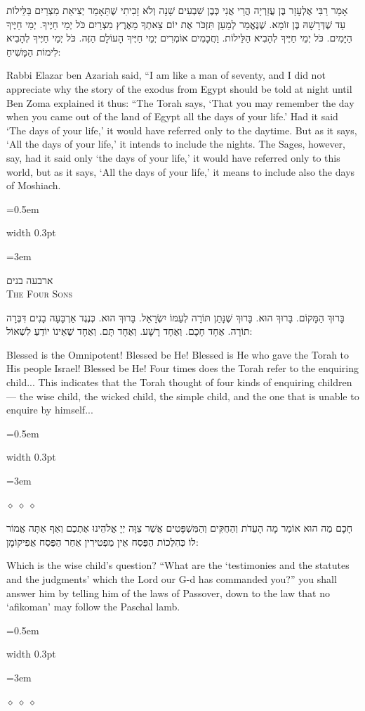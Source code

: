 \documentclass[11pt, openany]{book}
\newcommand{\sederdivider}{%
  \par\vspace{6pt}
  \begin{center}
    \textcolor{sedergold}{\pgfornament[width=1.5cm]{11}}
  \end{center}
  \par\vspace{6pt}
}
\newlength{\bidiHebWidth}
\newlength{\bidiEngWidth}
\newenvironment{bilingual}{%
  \par\vspace{4pt}%
}{%
  \noindent
  \begin{minipage}[t]{\bidiEngWidth}
    \setstretch{1.4}\emergencystretch=0.5em\normalsize
    \usebox{\bidiEngBox}
  \end{minipage}%
  \hfill
  {\color{sedergold}\vrule width 0.3pt}%
  \hfill
  \begin{minipage}[t]{\bidiHebWidth}
    \begingroup\hebrewfont\TeXXeTstate=1\beginR
    \large\setstretch{1.4}\emergencystretch=3em\tolerance=9999\parindent=0pt\relax
    \usebox{\bidiHebBox}
    \endR\endgroup
  \end{minipage}%
  \par\vspace{2pt}%
}
\newenvironment{hebrewcol}{%
  \begin{lrbox}{\bidiHebBox}\begin{minipage}{\bidiHebWidth}%
}{%
  \end{minipage}\end{lrbox}%
}
\newenvironment{englishcol}{%
  \begin{lrbox}{\bidiEngBox}\begin{minipage}{\bidiEngWidth}%
}{%
  \end{minipage}\end{lrbox}%
}
\newcommand{\parasep}{%
  \par\vspace{3pt}
  \begin{center}
    \textcolor{sedergold!50}{\tiny$\diamond\;\diamond\;\diamond$}
  \end{center}
  \par\vspace{3pt}
}
\newcommand{\subsedertitle}[2]{%
  \par\vspace{8pt}
  \begin{center}
    {\hebrewfontlarge\TeXXeTstate=1\beginR\textcolor{sederblue}{#1}\endR}\\[3pt]
    {\normalsize\scshape\textcolor{sederblue}{#2}}
  \end{center}
  \par\vspace{3pt}
}
\begin{document}
\begin{bilingual}
\begin{hebrewcol}
אָמַר רַבִּי אֶלְעָזָר בֶּן עֲזַרְיָה הֲרֵי אֲנִי כְּבֶן שִׁבְעִים שָׁנָה וְלֹא זָכִיתִי שֶׁתֵּאָמַר יְצִיאַת מִצְרַיִם בַּלֵּילוֹת עַד שֶׁדְּרָשָׁהּ בֶּן זוֹמָא. שֶׁנֶּאֱמַר לְמַעַן תִּזְכֹּר אֶת יוֹם צֵאתְךָ מֵאֶרֶץ מִצְרַיִם כֹּל יְמֵי חַיֶּיךָ. יְמֵי חַיֶּיךָ הַיָּמִים. כֹּל יְמֵי חַיֶּיךָ לְהָבִיא הַלֵּילוֹת. וַחֲכָמִים אוֹמְרִים יְמֵי חַיֶּיךָ הָעוֹלָם הַזֶּה. כֹּל יְמֵי חַיֶּיךָ לְהָבִיא לִימוֹת הַמָּשִׁיחַ:
\end{hebrewcol}
\begin{englishcol}
Rabbi Elazar ben Azariah said, ``I am like a man of seventy, and I did not appreciate why the story of the exodus from Egypt should be told at night until Ben Zoma explained it thus: ``The Torah says, `That you may remember the day when you came out of the land of Egypt all the days of your life.' Had it said `The days of your life,' it would have referred only to the daytime. But as it says, `All the days of your life,' it intends to include the nights. The Sages, however, say, had it said only `the days of your life,' it would have referred only to this world, but as it says, `All the days of your life,' it means to include also the days of Moshiach.
\end{englishcol}
\end{bilingual}
\sederdivider

\subsedertitle{ארבעה בנים}{The Four Sons}

\begin{bilingual}
\begin{hebrewcol}
בָּרוּךְ הַמָּקוֹם. בָּרוּךְ הוּא. בָּרוּךְ שֶׁנָּתַן תּוֹרָה לְעַמּוֹ יִשְׂרָאֵל. בָּרוּךְ הוּא. כְּנֶגֶד אַרְבָּעָה בָנִים דִּבְּרָה תוֹרָה. אֶחָד חָכָם. וְאֶחָד רָשָׁע. וְאֶחָד תָּם. וְאֶחָד שֶׁאֵינוֹ יוֹדֵעַ לִשְׁאוֹל:
\end{hebrewcol}
\begin{englishcol}
Blessed is the Omnipotent! Blessed be He! Blessed is He who gave the Torah to His people Israel! Blessed be He! Four times does the Torah refer to the enquiring child... This indicates that the Torah thought of four kinds of enquiring children --- the wise child, the wicked child, the simple child, and the one that is unable to enquire by himself...
\end{englishcol}
\end{bilingual}
\parasep

\begin{bilingual}
\begin{hebrewcol}
חָכָם מַה הוּא אוֹמֵר מָה הָעֵדֹת וְהַחֻקִּים וְהַמִּשְׁפָּטִים אֲשֶׁר צִוָּה יְיָ אֱלֹהֵינוּ אֶתְכֶם וְאַף אַתָּה אֱמוֹר לוֹ כְּהִלְכוֹת הַפֶּסַח אֵין מַפְטִירִין אַחַר הַפֶּסַח אֲפִיקוֹמָן:
\end{hebrewcol}
\begin{englishcol}
Which is the wise child's question? ``What are the `testimonies and the statutes and the judgments' which the Lord our G-d has commanded you?'' you shall answer him by telling him of the laws of Passover, down to the law that no `afikoman' may follow the Paschal lamb.
\end{englishcol}
\end{bilingual}
\parasep
\end{document}

